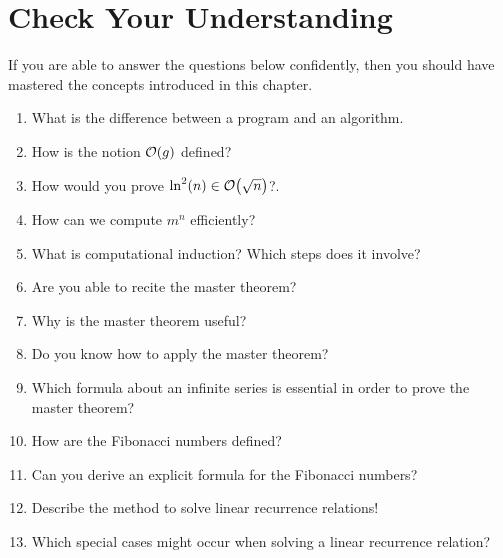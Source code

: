 \section{Check Your Understanding}
If you are able to answer the questions below confidently, then you should have mastered the concepts
introduced in this chapter.
\begin{enumerate}
\item What is the difference between a program and an algorithm.
\item How is the notion $\mathcal{O}(g)$ defined?
\item How would you prove $\ln^2(n) \in \mathcal{O}\bigl(\sqrt{n}\bigr)$?.
\item How can we compute $m^n$ efficiently?
\item What is computational induction?  Which steps does it involve?
\item Are you able to recite the master theorem?
\item Why is the master theorem useful?
\item Do you know how to apply the master theorem?
\item Which formula about an infinite series is essential in order to prove the master theorem?
\item How are the Fibonacci numbers defined?
\item Can you derive an explicit formula for the Fibonacci numbers?
\item Describe the method to solve linear recurrence relations!
\item Which special cases might occur when solving a linear recurrence relation?
\end{enumerate}

